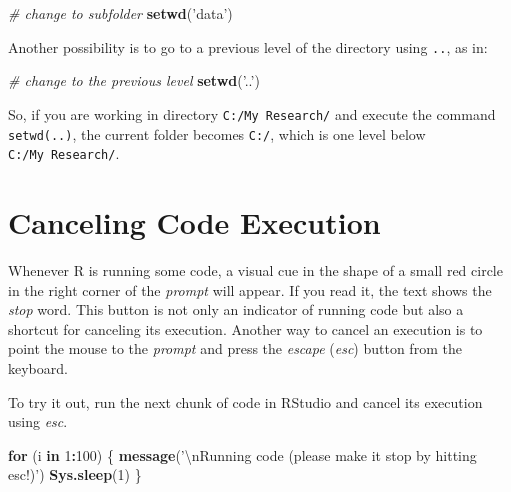 \documentclass[
  12pt,
]{book}
\newenvironment{Shaded}{\begin{snugshade}}{\end{snugshade}}
\newcommand{\CharTok}[1]{\textcolor[rgb]{0.5,0.5,0.5}{#1}}
\newcommand{\CommentTok}[1]{\textcolor[rgb]{0.37,0.37,0.37}{\textit{#1}}}
\newcommand{\ControlFlowTok}[1]{\textcolor[rgb]{0.27,0.27,0.27}{\textbf{#1}}}
\newcommand{\DecValTok}[1]{\textcolor[rgb]{0.06,0.06,0.06}{#1}}
\newcommand{\KeywordTok}[1]{\textcolor[rgb]{0.27,0.27,0.27}{\textbf{#1}}}
\newcommand{\NormalTok}[1]{#1}
\newcommand{\OperatorTok}[1]{\textcolor[rgb]{0.43,0.43,0.43}{\textbf{#1}}}
\newcommand{\StringTok}[1]{\textcolor[rgb]{0.5,0.5,0.5}{#1}}
\begin{document}
\begin{Shaded}
\begin{Highlighting}[]
\CommentTok{# change to subfolder}
\KeywordTok{setwd}\NormalTok{(}\StringTok{'data'}\NormalTok{)}
\end{Highlighting}
\end{Shaded}

Another possibility is to go to a previous level of the directory using \texttt{..}, as in:

\begin{Shaded}
\begin{Highlighting}[]
\CommentTok{# change to the previous level}
\KeywordTok{setwd}\NormalTok{(}\StringTok{'..'}\NormalTok{)}
\end{Highlighting}
\end{Shaded}

So, if you are working in directory \texttt{C:/My\ Research/} and execute the command \texttt{setwd(\textquotesingle{}..\textquotesingle{})}, the current folder becomes \texttt{C:/}, which is one level below \texttt{C:/My\ Research/}.

\hypertarget{canceling-code-execution}{%
\section{Canceling Code Execution}\label{canceling-code-execution}}

Whenever R is running some code, a visual cue in the shape of a small red circle in the right corner of the \emph{prompt} will appear. If you read it, the text shows the \emph{stop} word. This button is not only an indicator of running code but also a shortcut for canceling its execution. Another way to cancel an execution is to point the mouse to the \emph{prompt} and press the \emph{escape} (\emph{esc}) button from the keyboard.

To try it out, run the next chunk of code in RStudio and cancel its execution using \emph{esc}.

\begin{Shaded}
\begin{Highlighting}[]
\ControlFlowTok{for}\NormalTok{ (i }\ControlFlowTok{in} \DecValTok{1}\OperatorTok{:}\DecValTok{100}\NormalTok{) \{}
  \KeywordTok{message}\NormalTok{(}\StringTok{'}\CharTok{\textbackslash{}n}\StringTok{Running code (please make it stop by hitting esc!)'}\NormalTok{)}
  \KeywordTok{Sys.sleep}\NormalTok{(}\DecValTok{1}\NormalTok{)}
\NormalTok{\}}
\end{Highlighting}
\end{Shaded}
\end{document}
